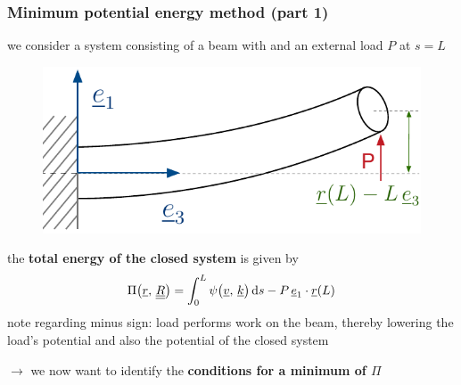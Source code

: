 \begin{frame}
  \frametitle{Minimum potential energy method (part 1)}
  
  we consider a system consisting of a beam with and an external load $P$ at $s=L$
  
  \vspace{-0.3em}
  \begin{figure}
    \centering
    \includegraphics[width=14cm, keepaspectratio=true]{sections/cosserat_rods/images/MinimumPotentialEnergyMethodExample}
  \end{figure}
  
  the \textbf{total energy of the closed system} is given by
  \begin{displaymath}
    \Pi \bigl( \underline{r}, \, \doubleunderline{R} \bigr) =
    \int_0^L \psi \bigl( \underline{v} , \, \underline{k} \bigr) \dif s - P \, \underline{e}_1 \cdot \underline{r}(L)
  \end{displaymath}
  note regarding minus sign: load performs work on the beam, \newline
  thereby lowering the load's potential and also the potential of the closed system
  
  \vspace{0.3em}
  $\rightarrow$ we now want to identify the \textbf{conditions for a minimum of $\Pi$}
\end{frame}


